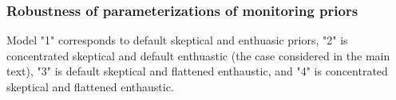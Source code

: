 \documentclass[12pt]{article}
\begin{document}

\newpage
\subsubsection{Robustness of parameterizations of monitoring priors}
%
Model "1" corresponds to default skeptical and enthuasic priors, "2" is concentrated skeptical and default enthuastic (the case considered in the main text), "3" is default skeptical and flattened enthaustic, and "4" is concentrated skeptical and flattened enthaustic.
\end{document}
